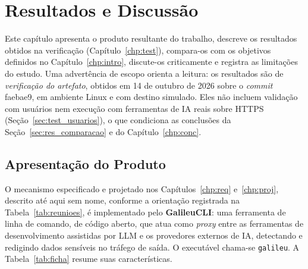 \chapter{Resultados e Discussão}\label{chp:res}

Este capítulo apresenta o produto resultante do trabalho, descreve os resultados obtidos na verificação (Capítulo~\ref{chp:test}), compara-os com os objetivos definidos no Capítulo~\ref{chp:intro}, discute-os criticamente e registra as limitações do estudo. Uma advertência de escopo orienta a leitura: os resultados são de \textit{verificação do artefato}, obtidos em 14 de outubro de 2026 sobre o \textit{commit} faebae9, em ambiente Linux e com destino simulado. Eles não incluem validação com usuários nem execução com ferramentas de IA reais sobre HTTPS (Seção~\ref{sec:test_usuarios}), o que condiciona as conclusões da Seção~\ref{sec:res_comparacao} e do Capítulo~\ref{chp:conc}.

\section{Apresentação do Produto}
\label{sec:res_produto}

O mecanismo especificado e projetado nos Capítulos~\ref{chp:req} e~\ref{chp:proj}, descrito até aqui sem nome, conforme a orientação registrada na Tabela~\ref{tab:reunioes}, é implementado pelo \textbf{GalileuCLI}: uma ferramenta de linha de comando, de código aberto, que atua como \textit{proxy} entre as ferramentas de desenvolvimento assistidas por LLM e os provedores externos de IA, detectando e redigindo dados sensíveis no tráfego de saída. O executável chama-se \texttt{galileu}. A Tabela~\ref{tab:ficha} resume suas características.

